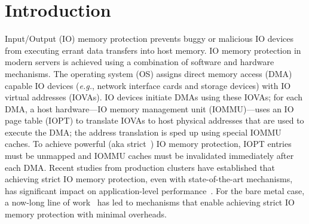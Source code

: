 \section{Introduction}
\label{sec:intro}
Input/Output (IO) memory protection prevents buggy or malicious IO devices from executing errant data transfers 
    into host memory. 
IO memory protection in modern servers is achieved using a combination of software and hardware mechanisms. 
The operating system (OS) assigns direct memory access (DMA) capable IO devices (\textit{e.g.},
    network interface cards and storage devices) with IO virtual addresses (IOVAs). 
IO devices initiate DMAs using these IOVAs; for each DMA, a host hardware---IO memory management unit (IOMMU)---uses 
    an IO page table (IOPT) to translate IOVAs to host physical addresses 
    that are used to execute the DMA; 
    the address translation is sped up using special IOMMU caches. 
To achieve powerful (aka strict~\cite{Amit2011vIOMMU,Rubin2024FastSafe}) IO memory protection, 
    IOPT entries must be unmapped and IOMMU caches must be invalidated immediately after each DMA. 
Recent studies from production clusters have established that achieving strict IO memory protection, 
    even with state-of-the-art mechanisms, 
    has significant impact on application-level performance~\cite{agarwal2022understanding}. 
For the bare metal case, a now-long line of work~\cite{ben2007price, Malka2015rIOMMU, malka2015efficient, peleg2015utilizing, Markuze2016true, markuze2018damn, RajapakshaIOMMU, Rubin2024FastSafe} 
    has led to mechanisms that enable achieving strict IO memory protection with minimal overheads.

